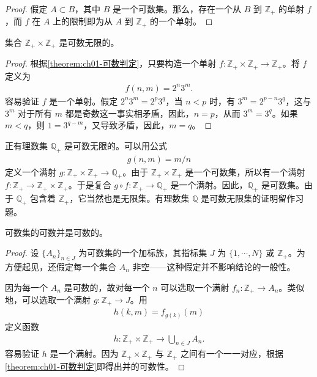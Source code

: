 \documentclass[../../main.tex]{subfiles}
\begin{document}
\begin{proof}
假定 $A \subset B$，其中 $B$ 是一个可数集。那么，存在一个从 $B$ 到 $\mathbb{Z}_{+}$ 的单射 $f$，而 $f$ 在 $A$ 上的限制即为从 $A$ 到 $\mathbb{Z}_{+}$ 的一个单射。
\end{proof}

\begin{corollary}\label{corollary:ch01-ZxZ可数}
集合 $\mathbb{Z}_{+} \times \mathbb{Z}_{+}$ 是可数无限的。
\end{corollary}

\begin{proof}
根据\cref{theorem:ch01-可数判定}，只要构造一个单射 $f: \mathbb{Z}_{+} \times \mathbb{Z}_{+} \longrightarrow \mathbb{Z}_{+}$。将 $f$ 定义为
\begin{align*}
f(n, m) = 2^{n}3^{m}.
\end{align*}
容易验证 $f$ 是一个单射。假定 $2^{n}3^{m} = 2^{p}3^{q}$，当 $n < p$ 时，有 $3^{m} = 2^{p-n}3^{q}$，这与 $3^{m}$ 对于所有 $m$ 都是奇数这一事实相矛盾，因此，$n = p$，从而 $3^{m} = 3^{q}$。如果 $m < q$，则 $1 = 3^{q-m}$，又导致矛盾，因此，$m = q$。
\end{proof}

\begin{example}\label{example:ch01-正有理数可数}
正有理数集 $\mathbb{Q}_{+}$ 是可数无限的。可以用公式
\begin{align*}
g(n, m) = m/n
\end{align*}
定义一个满射 $g: \mathbb{Z}_{+} \times \mathbb{Z}_{+} \longrightarrow \mathbb{Q}_{+}$。由于 $\mathbb{Z}_{+} \times \mathbb{Z}_{+}$ 是一个可数集，所以有一个满射 $f: \mathbb{Z}_{+} \longrightarrow \mathbb{Z}_{+} \times \mathbb{Z}_{+}$。于是复合 $g \circ f: \mathbb{Z}_{+} \longrightarrow \mathbb{Q}_{+}$ 是一个满射。因此，$\mathbb{Q}_{+}$ 是可数集。由于 $\mathbb{Q}_{+}$ 包含着 $\mathbb{Z}_{+}$，它当然也是无限集。有理数集 $\mathbb{Q}$ 是可数无限集的证明留作习题。
\end{example}

\begin{theorem}[可数集的可数并]\label{theorem:ch01-可数并}
可数集的可数并是可数的。
\end{theorem}

\begin{proof}
设 $\{A_{n}\}_{n \in J}$ 为可数集的一个加标族，其指标集 $J$ 为 $\{1, \cdots, N\}$ 或 $\mathbb{Z}_{+}$。为方便起见，还假定每一个集合 $A_{n}$ 非空——这种假定并不影响结论的一般性。

因为每一个 $A_{n}$ 是可数的，故对每一个 $n$ 可以选取一个满射 $f_{n}: \mathbb{Z}_{+} \longrightarrow A_{n}$。类似地，可以选取一个满射 $g: \mathbb{Z}_{+} \longrightarrow J$。用
\begin{align*}
h(k, m) = f_{g(k)}(m)
\end{align*}
定义函数
\begin{align*}
h: \mathbb{Z}_{+} \times \mathbb{Z}_{+} \longrightarrow \bigcup_{n \in J} A_{n}.
\end{align*}
容易验证 $h$ 是一个满射。因为 $\mathbb{Z}_{+} \times \mathbb{Z}_{+}$ 与 $\mathbb{Z}_{+}$ 之间有一个一一对应，根据\cref{theorem:ch01-可数判定}即得出并的可数性。
\end{proof}
\end{document}
